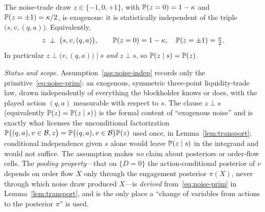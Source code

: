 \begin{assumption}\label{ass:noise-indep}
The noise-trade draw $z\in\{-1,0,+1\}$, with $\mathbb{P}(z=0)=1-\kappa$ and
$\mathbb{P}(z=\pm1)=\kappa/2$, is exogenous: it is statistically independent of the
triple $\bigl(s,v,(q,a)\bigr)$. Equivalently,
\begin{equation}\label{eq:noise-prim}
   z\;\perp\;\bigl(s,v,(q,a)\bigr),
   \qquad
   \mathbb{P}(z=0)=1-\kappa,\quad \mathbb{P}(z=\pm1)=\tfrac{\kappa}{2}.
\end{equation}
In particular $z\perp\bigl(v,(q,a)\bigr)\mid s$ \emph{and} $z\perp s$, so
$\mathbb{P}(z\mid s)=\mathbb{P}(z)$.
\end{assumption}

\noindent\emph{Status and scope.} Assumption~\ref{ass:noise-indep} records only
the primitive~\eqref{eq:noise-prim}: an exogenous, symmetric three-point
liquidity-trade law, drawn independently of everything the blockholder knows or
does, with the played action $(q,a)$ measurable with respect to $s$. The clause
$z\perp s$ (equivalently $\mathbb{P}(z)=\mathbb{P}(z\mid s)$) is the formal content of
``exogenous noise'' and is exactly what licenses the unconditional factorization
$\mathbb{P}\bigl((q,a),v\in\mathcal B,z\bigr)=\mathbb{P}\bigl((q,a),v\in\mathcal B\bigr)\mathbb{P}(z)$
used once, in Lemma~\ref{lem:transport}; conditional independence given $s$ alone
would leave $\mathbb{P}(z\mid s)$ in the integrand and would not suffice. The assumption
makes \emph{no} claim about posteriors or order-flow cells. The \emph{pooling
property}---that on $\{D=0\}$ the action-conditional posterior of $v$ depends on
order flow $X$ only through the engagement posterior $\pi(X)$, never through which
noise draw produced $X$---is \emph{derived} from~\eqref{eq:noise-prim} in
Lemma~\ref{lem:transport}, and is the only place a ``change of variables from
actions to the posterior $\pi$'' is used.

